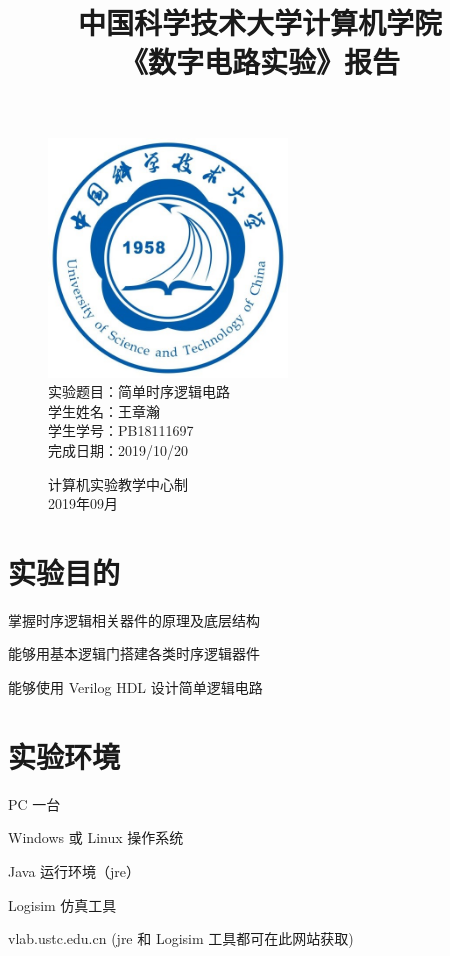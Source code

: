 \documentclass[UTF8]{article}
\title{中国科学技术大学计算机学院\\《数字电路实验》报告}
\author{}
\date{}
\begin{document}
	\maketitle
	\begin{figure}[H]
		\centering
		\includegraphics[width=2.5in]{xiaohui.jpg}\vspace{0.5cm}\\
		\large{
			实验题目：简单时序逻辑电路\\
			学生姓名：王章瀚\\
			学生学号：PB18111697\\
			完成日期：2019/10/20\\
		}\vspace{2cm}
		
		\large{计算机实验教学中心制\\2019年09月\\}
		\thispagestyle{empty}
		\clearpage  %
	\end{figure}


	\section{实验目的}
	掌握时序逻辑相关器件的原理及底层结构\par
	能够用基本逻辑门搭建各类时序逻辑器件\par
	能够使用 Verilog HDL 设计简单逻辑电路\par
	
	\section{实验环境}
	PC 一台\par
	Windows 或 Linux 操作系统\par
	Java 运行环境（jre）\par
	Logisim 仿真工具\par
	vlab.ustc.edu.cn (jre 和 Logisim 工具都可在此网站获取)\par
	
\end{document}

